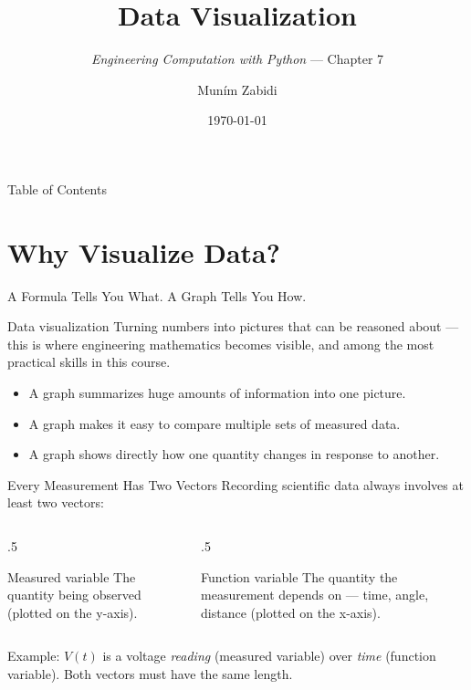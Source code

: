 \documentclass[9pt,aspectratio=169,xcolor=table]{beamer}
\title{Data Visualization}
\subtitle{\emph{Engineering Computation with Python} --- Chapter 7}
\author{Mun\'{i}m Zabidi}
\institute{\color{primary}Faculty of Electrical Engineering, Universiti Teknologi Malaysia}
\date{\today}
\begin{document}
\titlepage

\begin{frame}{Table of Contents}
    \tableofcontents
\end{frame}

\section{Why Visualize Data?}

\begin{frame}{A Formula Tells You What. A Graph Tells You How.}
    \leavevmode
    \begin{block}{Data visualization}
        Turning numbers into pictures that can be reasoned about --- this
        is where engineering mathematics becomes \alert{visible}, and
        among the most practical skills in this course.
    \end{block}

    \vspace{3mm}
    \begin{itemize}\small
        \item A graph summarizes huge amounts of information into one
              picture.
        \item A graph makes it easy to compare multiple sets of measured
              data.
        \item A graph shows directly how one quantity changes in
              response to another.
    \end{itemize}
\end{frame}

\begin{frame}{Every Measurement Has Two Vectors}
    \leavevmode
    Recording scientific data always involves at least two vectors:

    \vspace{2mm}
    \begin{columns}[t]
        \begin{column}{.5\textwidth}
            \begin{block}{Measured variable}
                \small The quantity being observed (plotted on the
                \alert{y-axis}).
            \end{block}
        \end{column}
        \begin{column}{.5\textwidth}
            \begin{block}{Function variable}
                \small The quantity the measurement depends on --- time,
                angle, distance (plotted on the \alert{x-axis}).
            \end{block}
        \end{column}
    \end{columns}

    \vspace{3mm}
    {\small Example: $V(t)$ is a voltage \emph{reading} (measured
    variable) over \emph{time} (function variable). Both vectors must
    have the \alert{same length}.}
\end{frame}
\end{document}
